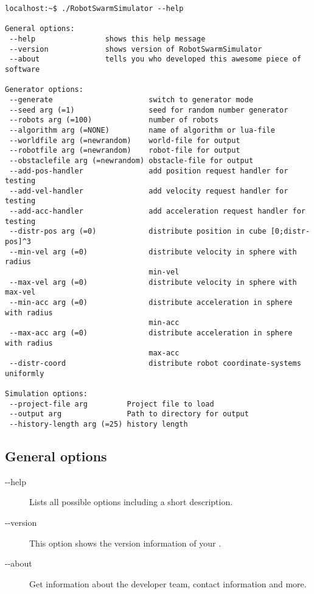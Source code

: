 \documentclass[a4paper,halfparskip,11pt,twoside]{scrartcl}
\begin{document}
\begin{lstlisting}[caption={RSS Helpline},label=lst:RSS-help]
localhost:~$ ./RobotSwarmSimulator --help

General options:
 --help                shows this help message
 --version             shows version of RobotSwarmSimulator
 --about               tells you who developed this awesome piece of software

Generator options:
 --generate                      switch to generator mode
 --seed arg (=1)                 seed for random number generator
 --robots arg (=100)             number of robots
 --algorithm arg (=NONE)         name of algorithm or lua-file
 --worldfile arg (=newrandom)    world-file for output
 --robotfile arg (=newrandom)    robot-file for output
 --obstaclefile arg (=newrandom) obstacle-file for output
 --add-pos-handler               add position request handler for testing
 --add-vel-handler               add velocity request handler for testing
 --add-acc-handler               add acceleration request handler for testing
 --distr-pos arg (=0)            distribute position in cube [0;distr-pos]^3
 --min-vel arg (=0)              distribute velocity in sphere with radius
                                 min-vel
 --max-vel arg (=0)              distribute velocity in sphere with max-vel
 --min-acc arg (=0)              distribute acceleration in sphere with radius
                                 min-acc
 --max-acc arg (=0)              distribute acceleration in sphere with radius
                                 max-acc
 --distr-coord                   distribute robot coordinate-systems uniformly

Simulation options:
 --project-file arg         Project file to load
 --output arg               Path to directory for output
 --history-length arg (=25) history length
\end{lstlisting}


\subsection{General options}
\begin{description}
	\item [-{}-help] Lists all possible options including a short description.
	\item [-{}-version] This option shows the version information of your \RSS.
	\item [-{}-about] Get information about the developer team, contact information and more.
\end{description}
\end{document}
